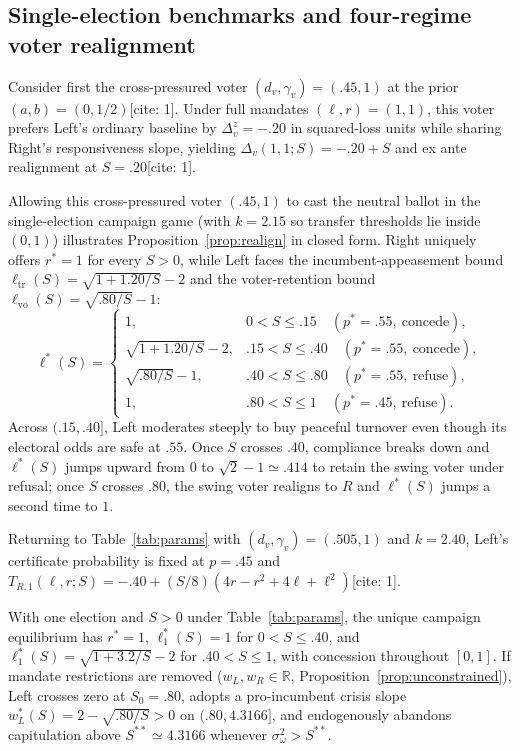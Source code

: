 \subsection{Single-election benchmarks and four-regime voter realignment}

Consider first the cross-pressured voter $(d_v,\gamma_v)=(.45,1)$ at the prior $(a,b)=(0,1/2)$[cite: 1]. Under full mandates $(\ell,r)=(1,1)$, this voter prefers Left's ordinary baseline by $\Delta_v^z=-.20$ in squared-loss units while sharing Right's responsiveness slope, yielding $\Delta_v(1,1;S)=-.20+S$ and ex ante realignment at $S=.20$[cite: 1].

Allowing this cross-pressured voter $(.45,1)$ to cast the neutral ballot in the single-election campaign game (with $k=2.15$ so transfer thresholds lie inside $(0,1)$) illustrates Proposition~\ref{prop:realign} in closed form. Right uniquely offers $r^*=1$ for every $S>0$, while Left faces the incumbent-appeasement bound $\ell_{\mathrm{tr}}(S)=\sqrt{1+1.20/S}-2$ and the voter-retention bound $\ell_{\mathrm{vo}}(S)=\sqrt{.80/S}-1$:
\[
 \ell^*(S)=
 \begin{cases}
 1, & 0<S\le .15 \quad (p^*=.55,\ \text{concede}),\\
 \sqrt{1+1.20/S}-2, & .15<S\le .40 \quad (p^*=.55,\ \text{concede}),\\
 \sqrt{.80/S}-1, & .40<S\le .80 \quad (p^*=.55,\ \text{refuse}),\\
 1, & .80<S\le 1 \quad (p^*=.45,\ \text{refuse}).
 \end{cases}
\]
Across $(.15,.40]$, Left moderates steeply to buy peaceful turnover even though its electoral odds are safe at $.55$. Once $S$ crosses $.40$, compliance breaks down and $\ell^*(S)$ jumps upward from $0$ to $\sqrt{2}-1\simeq .414$ to retain the swing voter under refusal; once $S$ crosses $.80$, the swing voter realigns to $R$ and $\ell^*(S)$ jumps a second time to $1$.

Returning to Table~\ref{tab:params} with $(d_v,\gamma_v)=(.505,1)$ and $k=2.40$, Left's certificate probability is fixed at $p=.45$ and $T_{R,1}(\ell,r;S)=-.40+(S/8)(4r-r^2+4\ell+\ell^2)$[cite: 1].

\begin{result}\label{cor:onet}
With one election and $S>0$ under Table~\ref{tab:params}, the unique campaign equilibrium has $r^*=1$, $\ell_1^*(S)=1$ for $0<S\le .40$, and $\ell_1^*(S)=\sqrt{1+3.2/S}-2$ for $.40<S\le 1$, with concession throughout $[0,1]$. If mandate restrictions are removed ($w_L,w_R\in\mathbb R$, Proposition~\ref{prop:unconstrained}), Left crosses zero at $S_0=.80$, adopts a pro-incumbent crisis slope $w_L^*(S)=2-\sqrt{.80/S}>0$ on $(.80,4.3166]$, and endogenously abandons capitulation above $S^{**}\simeq 4.3166$ whenever $\sigma_\omega^2>S^{**}$.
\end{result}

